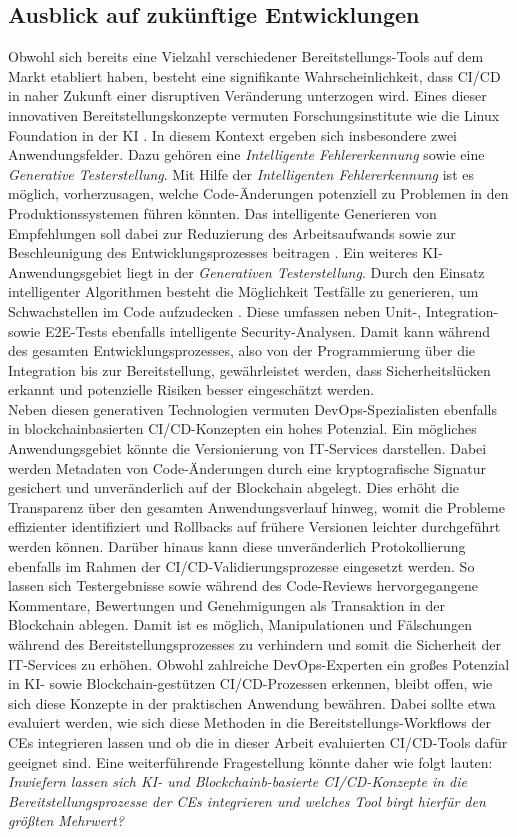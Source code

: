 \subsection{Ausblick auf zukünftige Entwicklungen}

Obwohl sich bereits eine Vielzahl verschiedener Bereitstellungs-Tools auf dem Markt etabliert haben, besteht eine signifikante Wahrscheinlichkeit, dass CI/CD in naher Zukunft einer disruptiven Veränderung unterzogen wird. Eines dieser innovativen Bereitstellungskonzepte vermuten Forschungsinstitute wie die Linux Foundation in der KI \cite{Foundation.2022}. In diesem Kontext ergeben sich insbesondere zwei Anwendungsfelder. Dazu gehören eine \textit{Intelligente Fehlererkennung} sowie eine \textit{Generative Testerstellung}. Mit Hilfe der \textit{Intelligenten Fehlererkennung} ist es möglich, vorherzusagen, welche Code-Änderungen potenziell zu Problemen in den Produktionssystemen führen könnten. Das intelligente Generieren von Empfehlungen soll dabei zur Reduzierung des Arbeitsaufwands sowie zur Beschleunigung des Entwicklungsprozesses beitragen \cite{.20230419d}. Ein weiteres KI-Anwendungsgebiet liegt in der \textit{Generativen Testerstellung}. Durch den Einsatz intelligenter Algorithmen besteht die Möglichkeit Testfälle zu generieren, um Schwachstellen im Code aufzudecken \cite{Fernandes.20210223}. Diese umfassen neben Unit-, Integration- sowie E2E-Tests ebenfalls intelligente Security-Analysen. Damit kann während des gesamten Entwicklungsprozesses, also von der Programmierung über die Integration bis zur Bereitstellung, gewährleistet werden, dass Sicherheitslücken erkannt und potenzielle Risiken besser eingeschätzt werden.\\ Neben diesen generativen Technologien vermuten DevOps-Spezialisten ebenfalls in blockchainbasierten CI/CD-Konzepten ein hohes Potenzial. Ein mögliches Anwendungsgebiet könnte die Versionierung von IT-Services darstellen. Dabei werden Metadaten von Code-Änderungen durch eine kryptografische Signatur gesichert und unveränderlich auf der Blockchain abgelegt. Dies erhöht die Transparenz über den gesamten Anwendungsverlauf hinweg, womit die Probleme effizienter identifiziert und Rollbacks auf frühere Versionen leichter durchgeführt werden können. Darüber hinaus kann diese unveränderlich Protokollierung ebenfalls im Rahmen der CI/CD-Validierungsprozesse eingesetzt werden. So lassen sich Testergebnisse sowie während des Code-Reviews hervorgegangene Kommentare, Bewertungen und Genehmigungen als Transaktion in der Blockchain ablegen. Damit ist es möglich, Manipulationen und Fälschungen während des Bereitstellungsprozesses zu verhindern und somit die Sicherheit der IT-Services zu erhöhen. Obwohl zahlreiche DevOps-Experten ein großes Potenzial in KI- sowie Blockchain-gestützen CI/CD-Prozessen erkennen, bleibt offen, wie sich diese Konzepte in der praktischen Anwendung bewähren. Dabei sollte etwa evaluiert werden, wie sich diese Methoden in die Bereitstellungs-Workflows der CEs integrieren lassen und ob die in dieser Arbeit evaluierten CI/CD-Tools dafür geeignet sind. Eine weiterführende Fragestellung könnte daher wie folgt lauten:\\
\textit{Inwiefern lassen sich KI- und Blockchainb-basierte CI/CD-Konzepte in die Bereitstellungsprozesse der CEs integrieren und welches Tool birgt hierfür den größten Mehrwert?}
